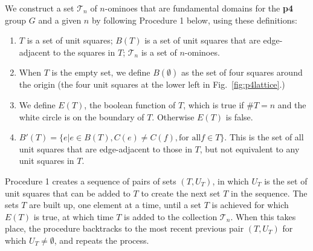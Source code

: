 \documentclass{ws-ijcga}
\begin{document}
We construct a set $\mathscr{T}_n$ of $n$-ominoes
that are fundamental domains for the {\bf p4} group $G$ and a
given $n$ by following Procedure 1 below, using these definitions:

\begin{enumerate}
\item
$T$ is a set of unit squares; $B(T)$ is a set of unit squares that are edge-adjacent to the squares
in $T$; $\mathscr{T}_n$ is a set of $n$-ominoes.
\item
When $T$ is the empty set, we define $B(\emptyset)$ as the set of four squares around the origin (the
four unit squares at the lower left in Fig.~\ref{fig:p4lattice}.)
\item
We define $E(T)$, the boolean function of $T$, which is true if $\# T = n$ and the white circle is on
the boundary of $T$. Otherwise $E(T)$ is false.
\item
$ B'(T)=\{e| e \in B(T), C(e)\ne C(f), \mbox{for all} f \in T \} $. 
This is the set of all unit squares that are
edge-adjacent to those in $T$, but not equivalent to any unit squares in $T$.
\end{enumerate}

Procedure 1 creates a sequence of pairs of sets $(T, U_T)$, 
in which $U_T$ is the set of unit squares
that can be added to $T$ to create the next set $T$ in the sequence. 
The sets $T$ are built up, one
element at a time, until a set $T$ is achieved for which $E(T)$ is true, 
at which time $T$ is added to the
collection $\mathscr{T}_n$. 
When this takes place, the procedure backtracks to the most recent previous pair
$(T, U_T)$ for which $U_T \ne \emptyset$, and repeats the process.
\end{document}
